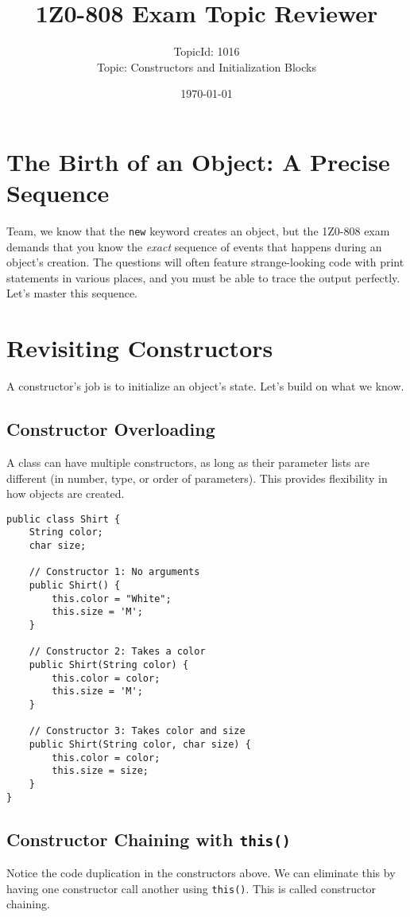 \documentclass[12pt]{article}
\title{\textbf{1Z0-808 Exam Topic Reviewer}}
\author{TopicId: 1016 \\ Topic: Constructors and Initialization Blocks}
\date{\today}
\begin{document}
\maketitle
\newpage\begin{enumerate}[label=(\arabic*)]
\section*{The Birth of an Object: A Precise Sequence}
Team, we know that the \texttt{new} keyword creates an object, but the 1Z0-808 exam demands that you know the \textit{exact} sequence of events that happens during an object's creation. The questions will often feature strange-looking code with print statements in various places, and you must be able to trace the output perfectly. Let's master this sequence.

\section{Revisiting Constructors}
A constructor's job is to initialize an object's state. Let's build on what we know.

\subsection*{Constructor Overloading}
A class can have multiple constructors, as long as their parameter lists are different (in number, type, or order of parameters). This provides flexibility in how objects are created.
\begin{verbatim}
public class Shirt {
    String color;
    char size;

    // Constructor 1: No arguments
    public Shirt() {
        this.color = "White";
        this.size = 'M';
    }

    // Constructor 2: Takes a color
    public Shirt(String color) {
        this.color = color;
        this.size = 'M';
    }

    // Constructor 3: Takes color and size
    public Shirt(String color, char size) {
        this.color = color;
        this.size = size;
    }
}
\end{verbatim}

\subsection*{Constructor Chaining with \texttt{this()}}
Notice the code duplication in the constructors above. We can eliminate this by having one constructor call another using \texttt{this()}. This is called constructor chaining.


\end{enumerate}
\end{document}

